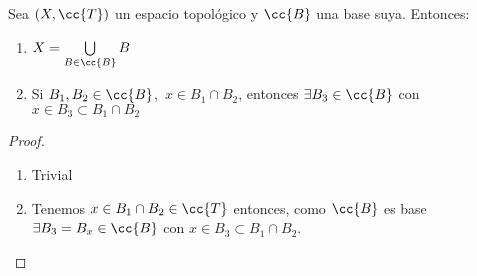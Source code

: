 \begin{teo}
    Sea $(X,\cc{T})$ un espacio topológico y $\cc{B}$ una base suya. Entonces:
    \begin{enumerate}
        \item[\objetivo{B1}] $X=\bigcup\limits_{B\in \cc{B}}B$
        \item[\objetivo{B2}] Si $B_1,B_2\in \cc{B}$,\ $x\in B_1\cap B_2$, entonces $\exists B_3 \in \cc{B}$ con $x\in B_3 \subset B_1 \cap B_2$
    \end{enumerate}

    \begin{proof}\
        \begin{enumerate}
            \item[\apuntar{B1}] Trivial
            \item[\apuntar{B2}] Tenemos $x\in B_1\cap B_2\in \cc{T}$ entonces, como $\cc{B}$ es base $\exists B_3=B_x \in \cc{B}$ con $x\in B_3 \subset B_1 \cap B_2$.
        \end{enumerate}
    \end{proof}
\end{teo}


